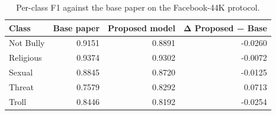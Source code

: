 \begin{table}
\caption{Per-class F1 against the base paper on the Facebook-44K protocol.}
\label{tab:basepaper_per_class}
\begin{tabular}{lrrr}
\toprule
Class & Base paper & Proposed model & Δ Proposed − Base \\
\midrule
Not Bully & 0.9151 & 0.8891 & -0.0260 \\
Religious & 0.9374 & 0.9302 & -0.0072 \\
Sexual & 0.8845 & 0.8720 & -0.0125 \\
Threat & 0.7579 & 0.8292 & 0.0713 \\
Troll & 0.8446 & 0.8192 & -0.0254 \\
\bottomrule
\end{tabular}
\end{table}
